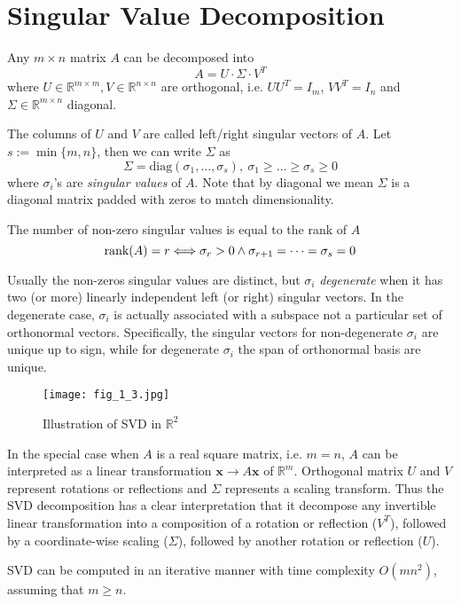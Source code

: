 \documentclass[../main.tex]{subfiles}
\begin{document}
\section{Singular Value Decomposition}
Any $m\times n$ matrix $A$ can be decomposed into
\begin{equation*}
A=U\cdot \Sigma \cdot V^T
\end{equation*}
where $U\in \mathbb{R}^{m\times m},V\in \mathbb{R}^{n\times n}$ are orthogonal, i.e. $UU^T=I_m$, $VV^T=I_n$ and $\Sigma\in \mathbb{R}^{m\times n}$ diagonal. 
\par The columns of $U$ and $V$ are called left/right singular vectors of $A$. Let $s:=\min\{m,n\}$, then we can write $\Sigma$ as $$\Sigma = \text{diag}(\sigma_1,\dots,\sigma_s),\ \sigma_1\geq\dots\geq\sigma_s\geq0$$
where $\sigma_i$'s are \emph{singular values} of $A$. Note that by diagonal we mean $\Sigma$ is a diagonal matrix padded with zeros to match dimensionality. 
\par The number of non-zero singular values is equal to the rank of $A$
\begin{equation*}
{\rm rank}(A)=r\Longleftrightarrow\sigma_r>0\wedge \sigma_{r+1}=\dots=\sigma_{s}=0
\end{equation*}
\par Usually the non-zeros singular values are distinct, but $\sigma_i$ \emph{degenerate} when it has two (or more) linearly independent left (or right) singular vectors. In the degenerate case, $\sigma_i$ is actually associated with a subspace not a particular set of orthonormal vectors. Specifically, the singular vectors for non-degenerate $\sigma_i$ are unique up to sign, while for degenerate $\sigma_i$ the span of orthonormal basis are unique.
\begin{figure}[h] 
	\centering 
	\texttt{[image: fig\_1\_3.jpg]} 
	\caption{Illustration of SVD in $\mathbb{R}^2$}\label{fig_1_3}
\end{figure}
\par In the special case when $A$ is a real square matrix, i.e. $m=n$, $A$ can be interpreted as a linear transformation $\bm{x}\rightarrow A\bm{x}$ of $\mathbb{R}^m$. Orthogonal matrix $U$ and $V$ represent rotations or reflections and $\Sigma$ represents a scaling transform. Thus the SVD decomposition has a clear interpretation that it decompose any invertible linear transformation into a composition of a rotation or reflection ($V^T$), followed by a coordinate-wise scaling ($\Sigma$), followed by another rotation or reflection ($U$).
\begin{remark}
	SVD can be computed in an iterative manner with time complexity $O(mn^2)$, assuming that $m\geq n$.
\end{remark}
\end{document}
